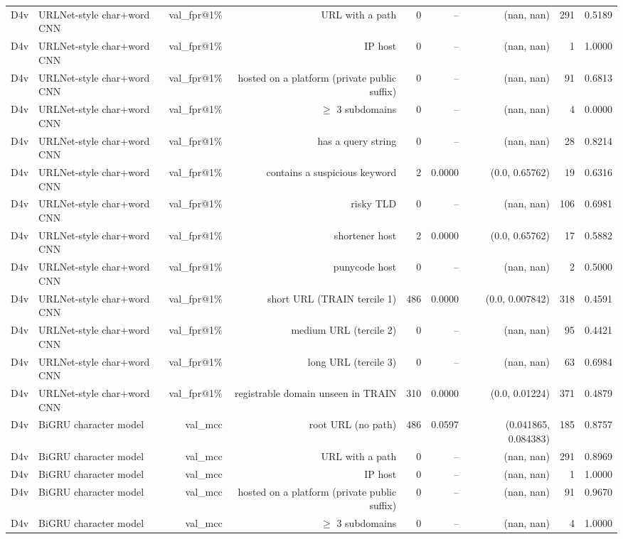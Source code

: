 \begin{table}[t]
\begin{tabular}{llrrrrrrr}
D4v & URLNet-style char+word CNN & val\_fpr@1\% & URL with a path & 0 & -- & (nan, nan) & 291 & 0.5189 \\
D4v & URLNet-style char+word CNN & val\_fpr@1\% & IP host & 0 & -- & (nan, nan) & 1 & 1.0000 \\
D4v & URLNet-style char+word CNN & val\_fpr@1\% & hosted on a platform (private public suffix) & 0 & -- & (nan, nan) & 91 & 0.6813 \\
D4v & URLNet-style char+word CNN & val\_fpr@1\% & $\geq$ 3 subdomains & 0 & -- & (nan, nan) & 4 & 0.0000 \\
D4v & URLNet-style char+word CNN & val\_fpr@1\% & has a query string & 0 & -- & (nan, nan) & 28 & 0.8214 \\
D4v & URLNet-style char+word CNN & val\_fpr@1\% & contains a suspicious keyword & 2 & 0.0000 & (0.0, 0.65762) & 19 & 0.6316 \\
D4v & URLNet-style char+word CNN & val\_fpr@1\% & risky TLD & 0 & -- & (nan, nan) & 106 & 0.6981 \\
D4v & URLNet-style char+word CNN & val\_fpr@1\% & shortener host & 2 & 0.0000 & (0.0, 0.65762) & 17 & 0.5882 \\
D4v & URLNet-style char+word CNN & val\_fpr@1\% & punycode host & 0 & -- & (nan, nan) & 2 & 0.5000 \\
D4v & URLNet-style char+word CNN & val\_fpr@1\% & short URL (TRAIN tercile 1) & 486 & 0.0000 & (0.0, 0.007842) & 318 & 0.4591 \\
D4v & URLNet-style char+word CNN & val\_fpr@1\% & medium URL (tercile 2) & 0 & -- & (nan, nan) & 95 & 0.4421 \\
D4v & URLNet-style char+word CNN & val\_fpr@1\% & long URL (tercile 3) & 0 & -- & (nan, nan) & 63 & 0.6984 \\
D4v & URLNet-style char+word CNN & val\_fpr@1\% & registrable domain unseen in TRAIN & 310 & 0.0000 & (0.0, 0.01224) & 371 & 0.4879 \\
D4v & BiGRU character model & val\_mcc & root URL (no path) & 486 & 0.0597 & (0.041865, 0.084383) & 185 & 0.8757 \\
D4v & BiGRU character model & val\_mcc & URL with a path & 0 & -- & (nan, nan) & 291 & 0.8969 \\
D4v & BiGRU character model & val\_mcc & IP host & 0 & -- & (nan, nan) & 1 & 1.0000 \\
D4v & BiGRU character model & val\_mcc & hosted on a platform (private public suffix) & 0 & -- & (nan, nan) & 91 & 0.9670 \\
D4v & BiGRU character model & val\_mcc & $\geq$ 3 subdomains & 0 & -- & (nan, nan) & 4 & 1.0000 \\

\end{tabular}
\end{table}
